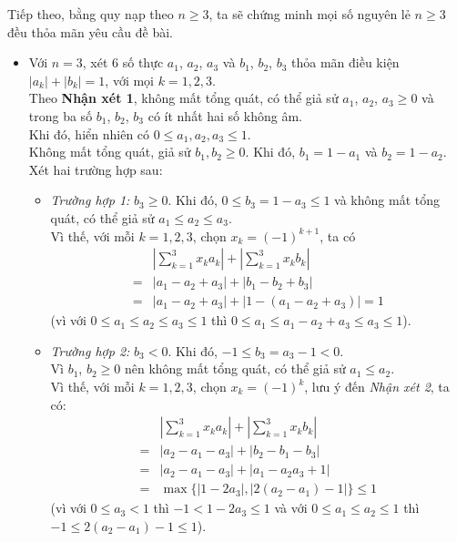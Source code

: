 \begin{bt}
{\begin{itemize}
\begin{itemize}
			\end{itemize}
			Tiếp theo, bằng quy nạp theo $n\ge3$, ta sẽ chứng minh mọi số nguyên lẻ $n\ge3$ đều thỏa mãn yêu cầu đề bài.
			\begin{itemize}
				\item Với $n=3$, xét $6$ số thực $a_1$, $a_2$, $a_3$ và $b_1$, $b_2$, $b_3$ thỏa mãn điều kiện $|a_k|+|b_k|=1$, với mọi $k=1,2,3$.\\
				Theo \textbf{Nhận xét 1}, không mất tổng quát, có thể giả sử $a_1$, $a_2$, $a_3\ge0$ và trong ba số $b_1$, $b_2$, $b_3$ có ít nhất hai số không âm.\\
				Khi đó, hiển nhiên có $0\le a_1,a_2,a_3\le1$.\\
				Không mất tổng quát, giả sử $b_1,b_2\ge0$. Khi đó, $b_1=1-a_1$ và $b_2=1-a_2$. Xét hai trường hợp sau:
				\begin{itemize}
					\item \textit{Trường hợp 1:} $b_3\ge0$. Khi đó, $0\le b_3=1-a_3\le1$ và không mất tổng quát, có thể giả sử $a_1\le a_2\le a_3$.\\
					Vì thế, với mỗi $k=1,2,3$, chọn $x_k=(-1)^{k+1}$, ta có 
					\begin{align*}
					&\left|\displaystyle\sum\limits_{k=1}^3x_ka_k\right|+\left|\displaystyle\sum\limits_{k=1}^3x_kb_k\right|\\
					=&|a_1-a_2+a_3|+|b_1-b_2+b_3|\\
					=&|a_1-a_2+a_3|+|1-(a_1-a_2+a_3)|=1
					\end{align*}
					(vì với $0\le a_1\le a_2\le a_3\le 1$ thì $0\le a_1\le a_1-a_2+a_3\le a_3\le 1$).
					\item \textit{Trường hợp 2:} $b_3<0$. Khi đó, $-1\le b_3=a_3-1<0$. \\
					Vì $b_1$, $b_2\ge0$ nên không mất tổng quát, có thể giả sử $a_1\le a_2$.\\
					Vì thế, với mỗi $k=1,2,3$, chọn $x_k=(-1)^k$, lưu ý đến \textit{Nhận xét 2}, ta có: 
					\begin{align*}
					&\left|\displaystyle\sum\limits_{k=1}^3x_ka_k\right|+\left|\displaystyle\sum\limits_{k=1}^3x_kb_k\right|\\
					=&|a_2-a_1-a_3|+|b_2-b_1-b_3|\\
					=&|a_2-a_1-a_3|+|a_1-a_2a_3+1|\\
					=&\max \{|1-2a_3|,|2(a_2-a_1)-1|\}\le1
					\end{align*}
					(vì với $0\le a_3<1$ thì $-1<1-2a_3\le1$ và với $0\le a_1\le a_2\le1$ thì $-1\le2(a_2-a_1)-1\le1$).\\

\end{itemize}
\end{itemize}
\end{itemize}}
\end{bt}

